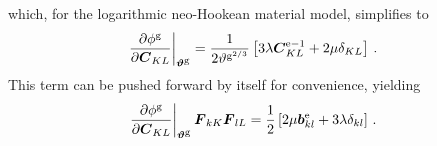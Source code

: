 \documentclass[10pt,letterpaper,oneside]{report}
\newcommand{\ten}[1]{\mbox{\boldmath $#1$}{}}
\newcommand{\tenf}[1]{\mbox{{\sffamily{\bfseries {#1}}}}}
\newcommand{\scas}[1]{\mbox{{\scriptsize{${\rm{#1}}$}}}{}}
\newcommand{\tens}[1]{\mbox{\boldmath{\scriptsize{$#1$}}}{}}
\begin{document}
which, for the logarithmic neo-Hookean material model, simplifies to
\begin{align}
\left. \frac{ \partial \phi^{\scas{g}} }{ \partial \ten{C}_{KL} } \right|_{\tens{\vartheta}^{\scas{g}}}  ={}& \frac{1}{2 \vartheta^{\scas{g}^{2/3}}} \left[ 3 \lambda \ten{C}^{\scas{e}-1}_{KL} + 2 \mu \delta_{KL} \right] \, . 
\end{align}
This term can be pushed forward by itself for convenience, yielding 
\begin{align}
\left. \frac{\partial \phi^{\scas{g}} }{\partial \ten{C}_{KL}} \right|_{\tens{\vartheta}^{\scas{g}}} \ten{F}_{kK} \ten{F}_{lL} 
={}& \frac{1}{2} \left[ 2 \mu \ten{b}^{\scas{e}}_{kl} + 3 \lambda \delta_{kl} \right] \, . 
\label{growth_criterion_deriv_Mandel}
\end{align}
\end{document}
